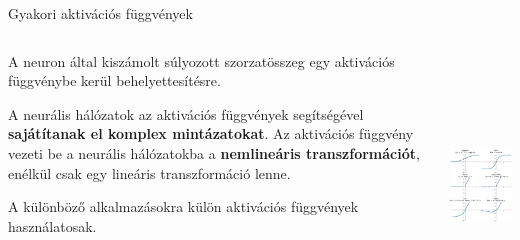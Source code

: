 \documentclass[english, aspectratio=169]{beamer}
\begin{document}
\begin{frame}{Gyakori aktivációs függvények}
\begin{columns}
\begin{column}{.5\textwidth}
A neuron által kiszámolt súlyozott szorzatösszeg egy aktivációs függvénybe kerül behelyettesítésre. \par\smallskip
A neurális hálózatok az aktivációs függvények segítségével \textbf{sajátítanak el komplex mintázatokat}. Az aktivációs függvény vezeti be a neurális hálózatokba a \textbf{nemlineáris transzformációt}, enélkül csak egy lineáris transzformáció lenne.\par\smallskip
A különböző alkalmazásokra külön aktivációs függvények használatosak.
\end{column}
\begin{column}{.5\textwidth}
\begin{center}
\includegraphics[height=7cm, keepaspectratio]{images/dl_2.png}
\end{center}
\end{column}
\end{columns}
\end{frame}
\end{document}
